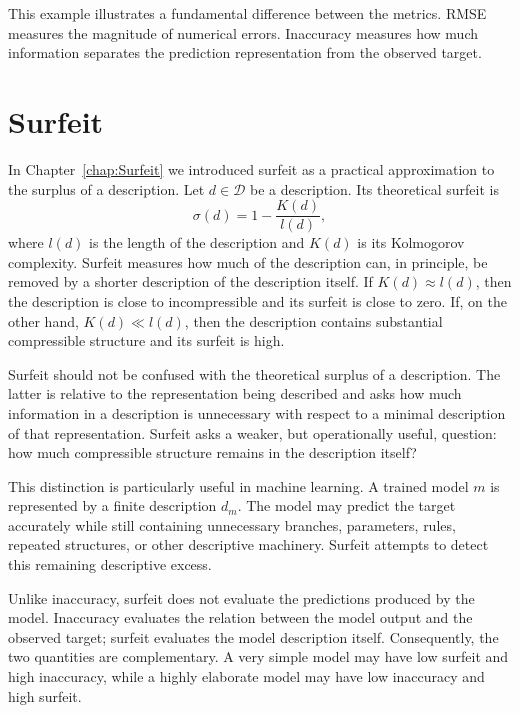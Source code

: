 This example illustrates a fundamental difference between the metrics. RMSE measures the magnitude of numerical errors. Inaccuracy measures how much information separates the prediction representation from the observed target.

%
%

\section{Surfeit}
\label{sec:machine_learning_surfeit}

In Chapter~\ref{chap:Surfeit} we introduced surfeit as a practical approximation to the surplus of a description. Let $d\in\mathcal{D}$ be a description. Its theoretical surfeit is
\[
\sigma(d) = 1 - \frac{K(d)}{l(d)},
\]
where $l(d)$ is the length of the description and $K(d)$ is its Kolmogorov complexity. Surfeit measures how much of the description can, in principle, be removed by a shorter description of the description itself. If $K(d)\approx l(d)$, then the description is close to incompressible and its surfeit is close to zero. If, on the other hand, $K(d)\ll l(d)$, then the description contains substantial compressible structure and its surfeit
is high.

Surfeit should not be confused with the theoretical surplus of a description. The latter is relative to the representation being described and asks how much information in a description is unnecessary with respect to a minimal description of that representation. Surfeit asks a weaker, but operationally useful, question: how much compressible structure remains in the description itself?

This distinction is particularly useful in machine learning. A trained model $m$ is represented by a finite description $d_m$. The model may predict the target accurately while still containing unnecessary branches, parameters, rules, repeated structures, or other descriptive machinery. Surfeit attempts to detect this remaining descriptive excess.

Unlike inaccuracy, surfeit does not evaluate the predictions produced by the model. Inaccuracy evaluates the relation between the model output and the observed target; surfeit evaluates the model description itself. Consequently, the two quantities are complementary. A very simple model may have low surfeit and high inaccuracy, while a highly elaborate model may have low inaccuracy and high surfeit.


